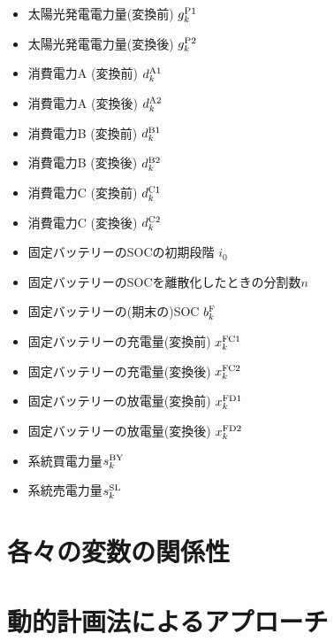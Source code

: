\documentclass{jarticle}
\newcommand{\IB}{$\bullet$}
\newcommand{\IC}{$\circ$}
\begin{document}
 \begin{itemize}
  \item[\IB] 太陽光発電電力量(変換前) $g^{\rm P1}_{k}$
  \item[\IC] 太陽光発電電力量(変換後) $g^{\rm P2}_{k}$
  \item[\IC] 消費電力A (変換前) $d^{\rm A1}_{k}$
  \item[\IB] 消費電力A (変換後) $d^{\rm A2}_{k}$
  \item[\IC] 消費電力B (変換前) $d^{\rm B1}_{k}$
  \item[\IB] 消費電力B (変換後) $d^{\rm B2}_{k}$
  \item[\IC] 消費電力C (変換前) $d^{\rm C1}_{k}$
  \item[\IB] 消費電力C (変換後) $d^{\rm C2}_{k}$
  \item[\IB] 固定バッテリーのSOCの初期段階 $i_{0}$
  \item[\IB] 固定バッテリーのSOCを離散化したときの分割数$n$
  \item[\IC] 固定バッテリーの(期末の)SOC $b^{\rm F}_{k}$
  \item[\IC] 固定バッテリーの充電量(変換前) $x^{\rm FC1}_{k}$
  \item[\IC] 固定バッテリーの充電量(変換後) $x^{\rm FC2}_{k}$
  \item[\IC] 固定バッテリーの放電量(変換前) $x^{\rm FD1}_{k}$
  \item[\IC] 固定バッテリーの放電量(変換後) $x^{\rm FD2}_{k}$ \\[-2.5ex]

  \item[\IC] 系統買電力量$s^{\rm BY}_{k}$
  \item[\IC] 系統売電力量$s^{\rm SL}_{k}$
  
\end{itemize}

\section{各々の変数の関係性}



\section{動的計画法によるアプローチ}
\end{document}
